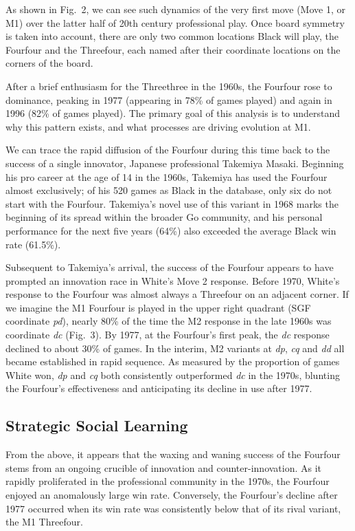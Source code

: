 \documentclass{article}
\begin{document}
\clearpage

As shown in Fig.~2, we can see such dynamics of the very first move (Move 1, or M1) over the latter half of 20th century professional play.  Once board symmetry is taken into account, there are only two common locations Black will play, the Fourfour and the Threefour, each named after their coordinate locations on the corners of the board. 

After a brief enthusiasm for the Threethree in the 1960s, the Fourfour rose to dominance, peaking in 1977 (appearing in 78\% of games played) and again in 1996 (82\% of games played).  The primary goal of this analysis is to understand why this pattern exists, and what processes are driving evolution at M1.

We can trace the rapid diffusion of the Fourfour during this time back to the success of a single innovator, Japanese professional Takemiya Masaki.  Beginning his pro career at the age of 14 in the 1960s, Takemiya has used the Fourfour almost exclusively; of his 520 games as Black in the database, only six do not start with the Fourfour.  Takemiya's novel use of this variant in 1968 marks the beginning of its spread within the broader Go community, and his personal performance for the next five years (64\%) also exceeded the average Black win rate (61.5\%).  

Subsequent to Takemiya's arrival, the success of the Fourfour appears to have prompted an innovation race in White's Move 2 response.  Before 1970, White's response to the Fourfour was almost always a Threefour on an adjacent corner.  If we imagine the M1 Fourfour is played in the upper right quadrant (SGF coordinate \textit{pd}), nearly 80\% of the time the M2 response in the late 1960s was coordinate \textit{dc} (Fig.~3).  By 1977, at the Fourfour's first peak, the \textit{dc} response declined to about 30\% of games.  In the interim, M2 variants at \textit{dp}, \textit{cq} and \textit{dd} all became established in rapid sequence.  As measured by the proportion of games White won, \textit{dp} and \textit{cq} both consistently outperformed \textit{dc} in the 1970s, blunting the Fourfour's effectiveness and anticipating its decline in use after 1977.




\subsection{Strategic Social Learning}

From the above, it appears that the waxing and waning success of the Fourfour stems from an ongoing crucible of innovation and counter-innovation.  As it rapidly proliferated in the professional community in the 1970s, the Fourfour enjoyed an anomalously large win rate.  Conversely, the Fourfour's decline after 1977 occurred when its win rate was consistently below that of its rival variant, the M1 Threefour.
\end{document}
